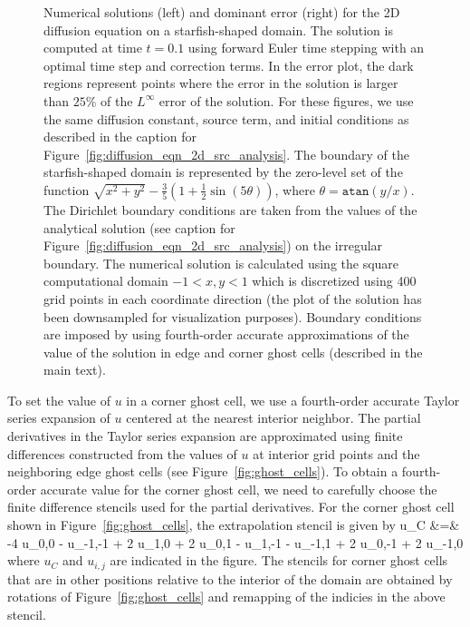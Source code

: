\documentclass[oneeqnum,onefignum,onetabnum,onethmnum]{siamltex}
\begin{document}
\begin{figure}[tb]
\begin{center}
\caption{Numerical solutions (left) and dominant error (right) for the 2D 
diffusion equation on a starfish-shaped domain.  The solution is computed at 
time $t = 0.1$ using forward Euler time stepping with an optimal time step 
and correction terms.  In the error plot, the dark regions represent points 
where the error in the solution is larger than $25$\% of the $L^\infty$ error 
of the solution.  For these figures, we use the same diffusion constant, 
source term, and initial conditions as described in the caption for 
Figure~\ref{fig:diffusion_eqn_2d_src_analysis}.  The boundary of the 
starfish-shaped domain is represented by the zero-level set of the function
$\sqrt{x^2 + y^2} - \frac{3}{5} \left(1 + \frac{1}{2}\sin(5 \theta) \right)$, 
where $\theta = \mathtt{atan}\left( y/x \right)$.
The Dirichlet boundary conditions are taken from the values of the analytical 
solution (see caption for Figure~\ref{fig:diffusion_eqn_2d_src_analysis})
on the irregular boundary.  The numerical solution is calculated using the 
square computational domain $-1 < x,y < 1$ which is discretized using 400 grid 
points in each coordinate direction (the plot of the solution has been 
downsampled for visualization purposes).  Boundary conditions are imposed by 
using fourth-order accurate approximations of the value of the solution in 
edge and corner ghost cells (described in the main text).
}
\label{fig:diffusion_eqn_2d_starfish_domain}
\end{center}
\end{figure}

To set the value of $u$ in a corner ghost cell, we use a fourth-order accurate
Taylor series expansion of $u$ centered at the nearest interior 
neighbor.  The partial derivatives in the Taylor series expansion are 
approximated using finite differences constructed from the values of $u$ 
at interior grid points and the neighboring edge ghost cells (see 
Figure~\ref{fig:ghost_cells}).  To obtain a fourth-order accurate value for 
the corner ghost cell, we need to carefully choose the finite difference 
stencils used for the partial derivatives.  For the corner ghost cell shown 
in Figure~\ref{fig:ghost_cells}, the extrapolation stencil is given by
\bea
  u_C &=&  -4 u_{0,0} - u_{-1,-1} + 2 u_{1,0} + 2 u_{0,1}
      - u_{1,-1} - u_{-1,1} + 2 u_{0,-1} + 2 u_{-1,0}
\eea
where $u_C$ and $u_{i,j}$ are indicated in the figure.  The stencils for
corner ghost cells that are in other positions relative to the interior of 
the domain are obtained by rotations of Figure~\ref{fig:ghost_cells} and 
remapping of the indicies in the above stencil.
\end{document}
